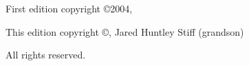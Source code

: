 
\makeatletter
\thispagestyle{empty}
\vspace*{\fill}
\begin{center}
\HUGE \@title
\end{center}
\vspace*{\fill}
\clearpage
\makeatother

\thispagestyle{empty}
\mbox{}
\clearpage

\renewcommand{\maketitlehookd}{%
\par
\vfill
\begin{center}
\texttt{[image: images/ci-badge]}
\vspace*{8\baselineskip}
\end{center}
}

\maketitle
\thispagestyle{empty}
\clearpage

\begingroup
\footnotesize\raggedright
\mbox{}
\vfill
\thispagestyle{empty}
\begin{minipage}[b]{0.9\textwidth}
\setlength{\parskip}{0.5\baselineskip}
\makeatletter
First edition copyright \copyright 2004,  \@author\par
This edition copyright \copyright \the\year , Jared Huntley Stiff (grandson)\par
\makeatother
\vspace*{2\baselineskip}

All rights reserved.\par
\vspace*{2\baselineskip}

\end{minipage}
\vspace*{2\baselineskip}
\vfill
{}
\endgroup
\clearpage
